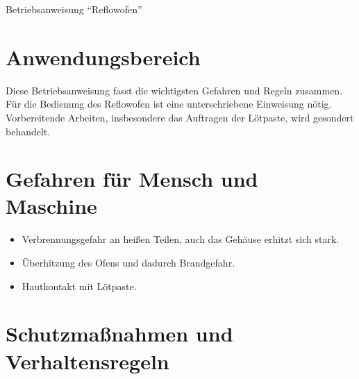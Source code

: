 \documentclass[fontsize=9pt]{scrartcl}
\newenvironment{smallitemize}{\begin{itemize}\itemsep -3pt}{\end{itemize}}
\begin{document}

\begin{center}
	\LARGE{Betriebsanweisung \enquote{Reflowofen}}
\end{center}


\section{Anwendungsbereich}
\begin{center}
	Diese Betriebsanweisung fasst die wichtigsten Gefahren und Regeln zusammen.\\
	Für die Bedienung des Reflowofen ist eine unterschriebene Einweisung nötig.\\
	Vorbereitende Arbeiten, insbesondere das Auftragen der Lötpaste, wird gesondert behandelt.\\
\end{center}

\section{Gefahren für Mensch und Maschine}

\begin{smallitemize}
	\item Verbrennungsgefahr an heißen Teilen, auch das Gehäuse erhitzt sich stark.
	\item Überhitzung des Ofens und dadurch Brandgefahr.
	\item Hautkontakt mit Lötpaste.
	\end{smallitemize}

\section{Schutzmaßnahmen und Verhaltensregeln}
\end{document}
